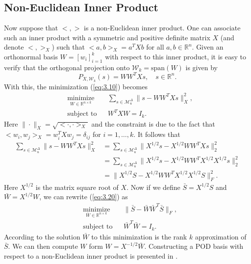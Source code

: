 \subsection{Non-Euclidean Inner Product}
Now suppose that $<,>$ is a non-Euclidean inner product. One can associate such an inner product with a symmetric and positive definite matrix $X$ (and denote $<,>_X$) such that $<a,b>_X = a^TXb$ for all $a,b\in \mathbb R^n$. Given an orthonormal basis $W = [w_i]_{i=1}^k$ with respect to this inner product, it is easy to verify that the orthogonal projection onto $\mathcal W_k = \text{span}(W)$ is given by
\begin{equation} \label{eq:3.19}
	P_{X,\mathcal W_k}(s) = WW^TXs, \quad s\in \mathbb R^{n}.
\end{equation}
With this, the minimization (\ref{eq:3.10}) becomes
\begin{equation} \label{eq:3.20}
\begin{aligned}
&  \underset{W\in\mathbb R^{n\times k}}{\text{minimize}}
& & \sum_{s\in \mathcal M_u^{\Delta}} \| s - WW^TXs\|^2_X, \\
& \text{subject to}
& & W^TXW=I_k.
\end{aligned}
\end{equation}
Here $\| \cdot \|_X = \sqrt{<\cdot , \cdot>_X}$ and the constraint is due to the fact that $<w_i,w_j>_X = w_i^TXw_j = \delta_{ij}$ for $i=1,\dots,k$. It follows that
\begin{equation} \label{eq:3.21}
\begin{aligned}
	\sum_{s\in \mathcal M_u^{\Delta}} \| s - WW^TXs\|^2_X &= \sum_{s\in \mathcal M_u^{\Delta}} \| X^{1/2}s - X^{1/2}WW^TXs\|_2^2 \\
	&= \sum_{s\in \mathcal M_u^{\Delta}} \| X^{1/2}s - X^{1/2}WW^TX^{1/2} X^{1/2}s\|_2^2 \\
	& = \| X^{1/2}S - X^{1/2}WW^TX^{1/2} X^{1/2}S \|_F^2.
\end{aligned}
\end{equation}
Here $X^{1/2}$ is the matrix square root of $X$. Now if we define $\bar S = X^{1/2} S$ and $\bar W = X^{1/2} W$, we can rewrite (\ref{eq:3.20}) as 
\begin{equation} \label{eq:3.22}
\begin{aligned}
&  \underset{\bar W\in\mathbb R^{n\times k}}{\text{minimize}}
& & \| \bar S - \bar W \bar W^T \bar S\|_F, \\
& \text{subject to}
& & \bar W^T\bar W=I_k.
\end{aligned}
\end{equation}
According to  the solution $\bar W$ to this minimization is the rank $k$ approximation of $\bar S$. We can then compute $W$ form $W = X^{-1/2}\bar W$. Constructing a POD basis with respect to a non-Euclidean inner product is presented in .


